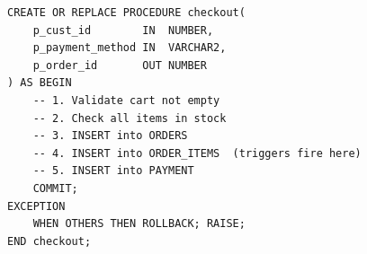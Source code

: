 \begin{lstlisting}[caption={checkout: atomic order placement with rollback}]
CREATE OR REPLACE PROCEDURE checkout(
    p_cust_id        IN  NUMBER,
    p_payment_method IN  VARCHAR2,
    p_order_id       OUT NUMBER
) AS BEGIN
    -- 1. Validate cart not empty
    -- 2. Check all items in stock
    -- 3. INSERT into ORDERS
    -- 4. INSERT into ORDER_ITEMS  (triggers fire here)
    -- 5. INSERT into PAYMENT
    COMMIT;
EXCEPTION
    WHEN OTHERS THEN ROLLBACK; RAISE;
END checkout;
\end{lstlisting}